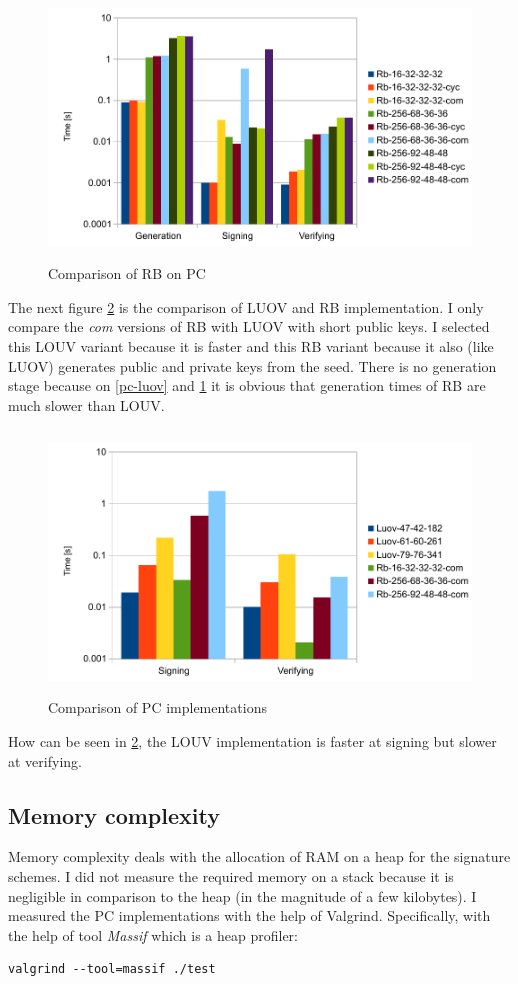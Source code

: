 \documentclass[thesis=M,english]{FITthesis}[2019/12/23]
\begin{document}
\begin{figure}[H]
\centering
\includegraphics[width=13cm,height=7cm]{images/pc-rb.pdf}
\caption{Comparison of RB on PC}
\label{pc-rb}
\end{figure}

\noindent
The next figure \ref{pc-all} is the comparison of LUOV and RB implementation. I only compare the \textit{com} versions of RB with LUOV with short public keys. I selected this LOUV variant because it is faster and this RB variant because it also (like LUOV) generates public and private keys from the seed.
There is no generation stage because on \ref{pc-luov} and \ref{pc-rb} it is obvious that generation times of RB are much slower than LOUV. 

\begin{figure}[H]
\centering
\includegraphics[width=13cm,height=7cm]{images/pc-all.pdf}
\caption{Comparison of PC implementations}
\label{pc-all}
\end{figure}

\noindent
How can be seen in \ref{pc-all}, the LOUV implementation is faster at signing but slower at verifying.

\subsection{Memory complexity}\label{pc-mem-measurement}
Memory complexity deals with the allocation of RAM on a heap for the signature schemes. I did not measure the required memory on a stack because it is negligible in comparison to the heap (in the magnitude of a few kilobytes). I measured the PC implementations with the help of Valgrind. Specifically, with the help of tool \textit{Massif} which is a heap profiler:
\begin{lstlisting}[frame=single]
valgrind --tool=massif ./test
\end{lstlisting}
\end{document}
